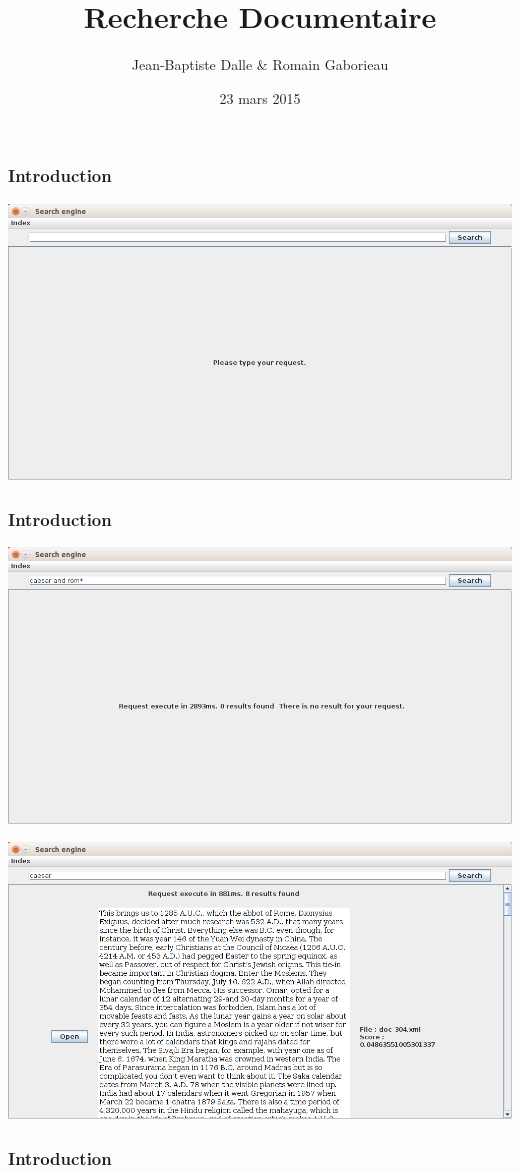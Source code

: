 \documentclass{beamer}
\title{Recherche Documentaire}
\author{Jean-Baptiste Dalle \& Romain Gaborieau}
\date{23 mars 2015}
\begin{document}
\maketitle

\begin{frame}
\frametitle{Introduction}


\includegraphics[width=1\linewidth]{img/home}

 
\end{frame}

\begin{frame}
\frametitle{Introduction}


\includegraphics[width=1\linewidth]{img/notfound}

 
\end{frame}

\begin{frame}


\includegraphics[width=1\linewidth]{img/found}
\frametitle{Introduction}

 
\end{frame}
\end{document}
